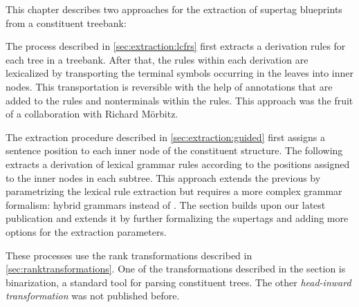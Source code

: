 \documentclass[../document.tex]{subfiles}
\begin{document}
    This chapter describes two approaches for the extraction of supertag blueprints from a constituent treebank:
    \begin{compactenum}
        \item
            The process described in \cref{sec:extraction:lcfrs} first extracts a derivation  rules for each tree in a treebank.
            After that, the rules within each derivation are lexicalized by transporting the terminal symbols occurring in the leaves into inner nodes.
            This transportation is reversible with the help of annotations that are added to the rules and nonterminals within the rules.
            This approach was the fruit of a collaboration with Richard Mörbitz. \citep{MoeRup20,RupMoe21}
        \item
            The extraction procedure described in \cref{sec:extraction:guided} first assigns a sentence position to each inner node of the constituent structure.
            The following extracts a derivation of lexical grammar rules according to the positions assigned to the inner nodes in each subtree.
            This approach extends the previous by parametrizing the lexical rule extraction but requires a more complex grammar formalism: hybrid grammars instead of .
            The section builds upon our latest publication \citep{Rup22} and extends it by further formalizing the supertags and adding more options for the extraction parameters.
    \end{compactenum}
    These processes use the rank transformations described in \cref{sec:ranktransformations}.
    One of the transformations described in the section is binarization, a standard tool for parsing constituent trees.
    The other \emph{head-inward transformation} was not published before.

    
    
    
    

\end{document}
